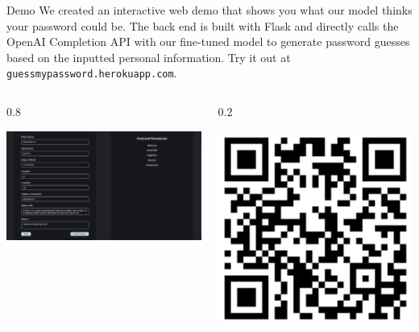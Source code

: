 \documentclass[final]{beamer}
\newlength{\colwidth}
\begin{document}
\begin{frame}[t]
\begin{columns}[t]
\begin{column}{\colwidth}
\begin{block}{Demo}
    We created an interactive web demo that shows you what our model thinks your password could be. The back end is built with Flask and directly calls the OpenAI Completion API with our fine-tuned model to generate password guesses based on the inputted personal information. Try it out at {\tt guessmypassword.herokuapp.com}.
    
    \vspace{12mm}
    
    \begin{columns}
    \begin{column}{0.8\colwidth}
    
     \includegraphics[width=\linewidth]{demo_screenshot.png}
     
    \end{column}
    
    \begin{column}{0.2\colwidth}
    
     \includegraphics[width=\linewidth]{demo_QR_code.pdf}
     

\end{column}
\end{columns}
\end{block}
\end{column}
\end{columns}
\end{frame}
\end{document}
